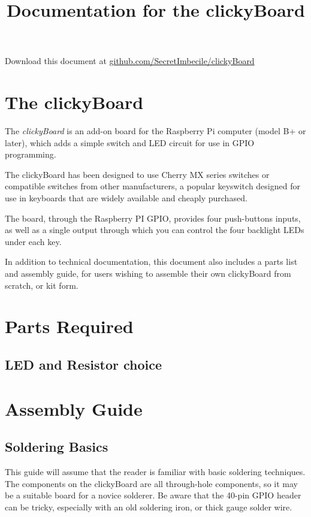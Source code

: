 \documentclass[10pt, a4paper, onesided]{article}
\title{Documentation for the clickyBoard}
\author{}
\date{}
\begin{document}
\maketitle
\vspace{-40pt}

Download this document at \href{https://github.com/SecretImbecile/clickyBoard}{github.com/SecretImbecile/clickyBoard}
\tableofcontents

\section{The clickyBoard}

	The \textit{clickyBoard} is an add-on board for the Raspberry Pi computer (model B+ or later), which adds a simple switch and LED circuit for use in GPIO programming.
	
	The clickyBoard has been designed to use Cherry MX series switches or compatible switches from other manufacturers, a popular keyswitch designed for use in keyboards that are widely available and cheaply purchased.
	
	The board, through the Raspberry PI GPIO, provides four push-buttons inputs, as well as a single output through which you can control the four backlight LEDs under each key.
	
	In addition to technical documentation, this document also includes a parts list and assembly guide, for users wishing to assemble their own clickyBoard from scratch, or kit form.

\newpage
\section{Parts Required}

	\subsection{LED and Resistor choice}
	\label{LEDresistors}
	
	
	

\section{Assembly Guide}

	\subsection*{Soldering Basics}
		This guide will assume that the reader is familiar with basic soldering techniques. The components on the clickyBoard are all through-hole components, so it may be a suitable board for a novice solderer. Be aware that the 40-pin GPIO header can be tricky, especially with an old soldering iron, or thick gauge solder wire.
		
\end{document}
